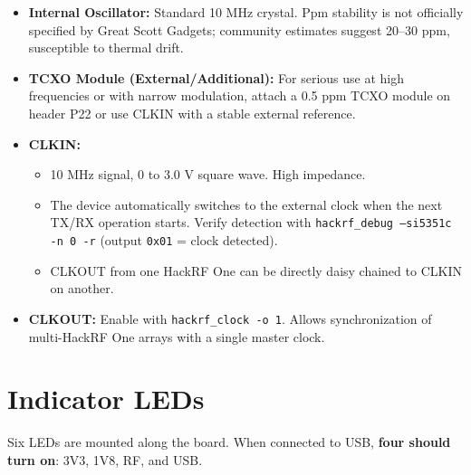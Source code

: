 \documentclass[11pt]{article}
\begin{document}
\begin{itemize}
    \item \textbf{Internal Oscillator:} Standard 10 MHz crystal. Ppm stability is not officially specified by Great Scott Gadgets; community estimates suggest 20--30 ppm, susceptible to thermal drift.
    \item \textbf{TCXO Module (External/Additional):} For serious use at high frequencies or with narrow modulation, attach a 0.5 ppm TCXO module on header P22 or use CLKIN with a stable external reference.
    \item \textbf{CLKIN:}
    \begin{itemize}
        \item 10 MHz signal, 0 to 3.0 V square wave. High impedance.
        \item The device automatically switches to the external clock when the next TX/RX operation starts. Verify detection with \texttt{hackrf\_debug --si5351c -n 0 -r} (output \texttt{0x01} = clock detected).
        \item CLKOUT from one HackRF One can be directly daisy chained to CLKIN on another.
    \end{itemize}
    \item \textbf{CLKOUT:} Enable with \texttt{hackrf\_clock -o 1}. Allows synchronization of multi-HackRF One arrays with a single master clock.
\end{itemize}

\section{Indicator LEDs}

Six LEDs are mounted along the board. When connected to USB, \textbf{four should turn on}: 3V3, 1V8, RF, and USB.
\end{document}
